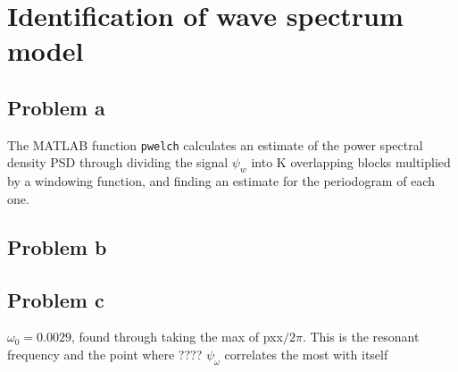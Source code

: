 \section{Identification of wave spectrum model}
\subsection{Problem a}
The MATLAB function \texttt{pwelch} calculates an estimate of the power spectral density PSD through
dividing the signal $\psi_w$ into K overlapping blocks multiplied by a windowing function, and finding an
estimate for the periodogram of each one.

\subsection{Problem b}

\subsection{Problem c}

$\omega_0 = 0.0029$, found through taking the max of pxx$/2\pi$. This is the resonant frequency and the
point where ???? $\psi_\omega$ correlates the most with itself